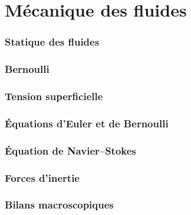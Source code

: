 \setcounter{part}{14}  %

\part{Mécanique des fluides}

\section{Statique des fluides}







\section{Bernoulli}


\section{Tension superficielle}




\section{\'Equations d'Euler et de Bernoulli}



\section{\'Equation de Navier--Stokes}



\section{Forces d'inertie}



\section{Bilans macroscopiques}